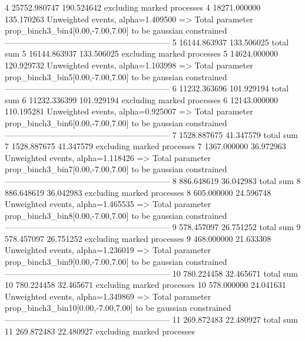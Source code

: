4          25752.980747    190.524642      excluding marked processes    
4          18271.000000    135.170263      Unweighted events, alpha=1.409500
  => Total parameter prop_binch3_bin4[0.00,-7.00,7.00] to be gaussian constrained
------------------------------------------------------------
5          16144.863937    133.506025      total sum                     
5          16144.863937    133.506025      excluding marked processes    
5          14624.000000    120.929732      Unweighted events, alpha=1.103998
  => Total parameter prop_binch3_bin5[0.00,-7.00,7.00] to be gaussian constrained
------------------------------------------------------------
6          11232.363696    101.929194      total sum                     
6          11232.336399    101.929194      excluding marked processes    
6          12143.000000    110.195281      Unweighted events, alpha=0.925007
  => Total parameter prop_binch3_bin6[0.00,-7.00,7.00] to be gaussian constrained
------------------------------------------------------------
7          1528.887675     41.347579       total sum                     
7          1528.887675     41.347579       excluding marked processes    
7          1367.000000     36.972963       Unweighted events, alpha=1.118426
  => Total parameter prop_binch3_bin7[0.00,-7.00,7.00] to be gaussian constrained
------------------------------------------------------------
8          886.648619      36.042983       total sum                     
8          886.648619      36.042983       excluding marked processes    
8          605.000000      24.596748       Unweighted events, alpha=1.465535
  => Total parameter prop_binch3_bin8[0.00,-7.00,7.00] to be gaussian constrained
------------------------------------------------------------
9          578.457097      26.751252       total sum                     
9          578.457097      26.751252       excluding marked processes    
9          468.000000      21.633308       Unweighted events, alpha=1.236019
  => Total parameter prop_binch3_bin9[0.00,-7.00,7.00] to be gaussian constrained
------------------------------------------------------------
10         780.224458      32.465671       total sum                     
10         780.224458      32.465671       excluding marked processes    
10         578.000000      24.041631       Unweighted events, alpha=1.349869
  => Total parameter prop_binch3_bin10[0.00,-7.00,7.00] to be gaussian constrained
------------------------------------------------------------
11         269.872483      22.480927       total sum                     
11         269.872483      22.480927       excluding marked processes    
